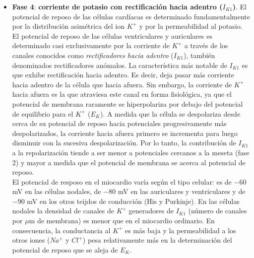 \begin{itemize}
        \item \textbf{Fase 4}: \textbf{corriente de potasio con rectificación hacia adentro ($I_{K1}$)}. El potencial de reposo de las células cardíacas es determinado fundamentalmente por la distribución asimétrica del ion $K^+$ y por la permeabilidad al potasio. El potencial de reposo de las células ventriculares y auriculares es determinado casi exclusivamente por la corriente de $K^+$ a través de los canales conocidos como \textit{rectificadores hacia adentro} ($I_{K1}$), también denominados rectificadores anómalos. La característica más notable de $I_{K1}$ es que exhibe rectificación hacia adentro. Es decir, deja pasar más corriente hacia adentro de la célula que hacia afuera. Sin embargo, la corriente de $K^+$ hacia afuera es la que atraviesa este canal en forma fisiológica, ya que el potencial de membrana raramente se hiperpolariza por debajo del potencial de equilibrio para el $K^+$ ($E_K$). A medida que la célula se despolariza desde cerca de su potencial de reposo hacia potenciales progresivamente más despolarizados, la corriente hacia afuera primero se incrementa para luego disminuir con la sucesiva despolarización. Por lo tanto, la contribución de $I_{K1}$ a la repolarización tiende a ser menor a potenciales cercanos a la meseta (fase 2) y mayor a medida que el potencial de membrana se acerca al potencial de reposo. \\
        El potencial de resposo en el miocardio varía según el tipo celular: es de $-60$ mV en las células nodales, de $-80$ mV en las auriculares y ventriculares y de $-90$ mV en los otros teijdos de conducción (His y Purkinje). En las células nodales la densidad de canales de $K^+$ generadores de $I_{K1}$ (número de canales por $\mu$m de membrana) es menor que en el miocardio ordinario. En consecuencia, la conductancia al $K^+$ es más baja y la permeabilidad a los otros iones ($Na^+$ y $Cl^+$) pesa relativamente más en la determinación del potencial de reposo que se aleja de $E_K$.
    \end{itemize}
    
